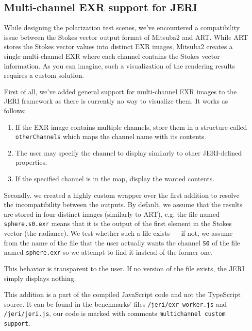 \subsection{Multi-channel EXR support for JERI}
\label{sec:multichannel_jeri}

While designing the polarization test scenes, we've encountered a compatibility issue between the Stokes vector output format of Mitsuba2 and ART. While ART stores the Stokes vector values into distinct EXR images, Mitsuba2 creates a single multi-channel EXR where each channel contains the Stokes vector information. As you can imagine, such a visualization of the rendering results requires a custom solution.

First of all, we've added general support for multi-channel EXR images to the JERI framework as there is currently no way to visualize them. It works as follows:

\begin{enumerate}
	\item If the EXR image contains multiple channels, store them in a structure called \texttt{otherChannels} which maps the channel name with its contents.
	\item The user may specify the channel to display similarly to other JERI-defined properties.
	\item If the specified channel is in the map, display the wanted contents.
\end{enumerate}

Secondly, we created a highly custom wrapper over the first addition to resolve the incompatibility between the outputs. By default, we assume that the results are stored in four distinct images (similarly to ART), e.g. the file named \texttt{sphere.s0.exr} means that it is the output of the first element in the Stokes vector (the radiance). We test whether such a file exists --- if not, we assume from the name of the file that the user actually wants the channel \texttt{S0} of the file named \texttt{sphere.exr} so we attempt to find it instead of the former one.

This behavior is transparent to the user. If no version of the file exists, the JERI simply displays nothing.

This addition is a part of the compiled JavaScript code and not the TypeScript source. It can be found in the benchmarks' files \texttt{/jeri/exr-worker.js} and \texttt{/jeri/jeri.js}, our code is marked with comments \texttt{multichannel custom support}.
